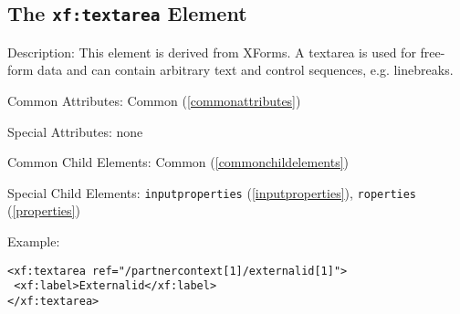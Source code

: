 \subsection{ The \texttt{xf:textarea} Element}
\begin{description}
 \item Description: This element is derived from XForms. A textarea is used for free-form data and can contain arbitrary text and control sequences, e.g. linebreaks.

 \item Common Attributes: Common (\ref{commonattributes})

 \item Special Attributes: none

 \item Common Child Elements: Common (\ref{commonchildelements})

 \item Special Child Elements: \texttt{inputproperties} (\ref{inputproperties}), \texttt{roperties} (\ref{properties})

 \item Example: 

\begin{lstlisting}[caption=\texttt{xf:textarea} Element]
<xf:textarea ref="/partnercontext[1]/externalid[1]">
 <xf:label>Externalid</xf:label>
</xf:textarea>
\end{lstlisting}
\end{description}











